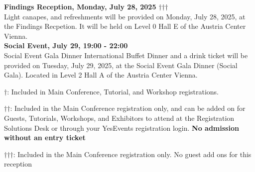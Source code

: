 \newpage
\textbf{Findings Reception, Monday, July 28, 2025 $\dagger$$\dagger$$\dagger$}\\
Light canapes, and refreshments will be provided on Monday, July 28, 2025, at the Findings Recpetion.  It will be held on Level 0 Hall E of the Austria Center Vienna.\\

\textbf{Social Event, July 29, 19:00 - 22:00}\\

Social Event Gala Dinner International Buffet Dinner and a drink ticket will be provided on Tuesday, July 29, 2025, at the Social Event Gala Dinner (Social Gala). Located in Level 2 Hall A of the Austria Center Vienna.

\vspace{4em}

$\dagger$: Included in Main Conference, Tutorial, and Workshop registrations.

$\dagger$$\dagger$: Included in the Main Conference registration only, and can be added on for Guests, Tutorials, Workshops, and Exhibitors to attend at the Registration Solutions Desk or through your YesEvents registration login. \textbf{No admission without an entry ticket}

$\dagger$$\dagger$$\dagger$: Included in the Main Conference registration only. No guest add ons for this reception
